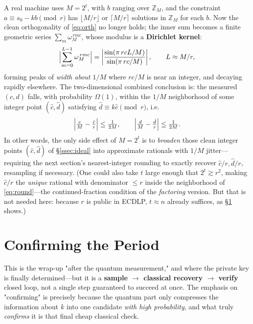 \documentclass[11pt]{article}
\newcommand{\secref}[1]{\hyperref[#1]{\S\ref*{#1}}}
\begin{document}
A real machine uses $M=2^t$, with $b$ ranging over $\mathbb{Z}_M$, and the constraint $a\equiv s_0-kb\pmod r$ has
$\lfloor M/r\rfloor$ or $\lceil M/r\rceil$ solutions in $\mathbb{Z}_M$ for each $b$. Now the clean orthogonality of \eqref{eq:orth} no longer holds; the inner sum becomes a finite geometric series
$\sum_{m}\omega_M^{\,r m c}$, whose modulus is a \textbf{Dirichlet kernel}:
\[
\Bigl|\sum_{m=0}^{L-1}\omega_M^{\,rmc}\Bigr|
=\left|\frac{\sin(\pi\,rcL/M)}{\sin(\pi\,rc/M)}\right|,\qquad L\approx M/r,
\]
forming peaks of \emph{width about $1/M$} where $rc/M$ is near an integer, and decaying rapidly elsewhere. The two-dimensional combined conclusion is: the measured $(c,d)$ falls, with
probability $\Omega(1)$, within the $1/M$ neighborhood of some integer point $(\hat c,\hat d)$ satisfying $\hat d\equiv k\hat c\pmod r$, i.e.
\begin{equation}
\Bigl|\tfrac{c}{M}-\tfrac{\hat c}{r}\Bigr|\le\tfrac{1}{2M},\qquad
\Bigl|\tfrac{d}{M}-\tfrac{\hat d}{r}\Bigr|\le\tfrac{1}{2M}.
\label{eq:round}
\end{equation}
In other words, the only side effect of $M=2^t$ is to \emph{broaden} those clean integer points $(\hat c,\hat d)$ of \secref{ssec:ideal} into approximate rationals with $1/M$ jitter---requiring the next section's nearest-integer rounding
to exactly recover $\hat c/r,\hat d/r$, resampling if necessary. (One could also take $t$ large enough that $2^t\gtrsim r^2$, making $\hat c/r$ the \emph{unique} rational with denominator $\le r$ inside the neighborhood of \eqref{eq:round}---the continued-fraction condition of the \emph{factoring} version. But that is not needed here: because $r$ is public in ECDLP, $t\approx n$ already suffices, as \secref{sec:period} shows.)

\section{Confirming the Period}
\label{sec:period}

This is the wrap-up "after the quantum measurement," and where the private key is finally determined---but it is a \textbf{sample $\to$ classical recovery $\to$ verify} closed loop,
not a single step guaranteed to succeed at once. The emphasis on "confirming" is precisely because the quantum part only compresses the information about $k$ into one candidate \emph{with high probability},
and what truly \emph{confirms} it is that final cheap classical check.
\end{document}
